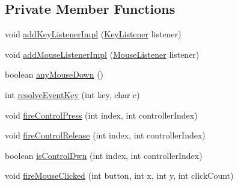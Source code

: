 \subsection*{Private Member Functions}
\begin{DoxyCompactItemize}
\item 
void \mbox{\hyperlink{classorg_1_1newdawn_1_1slick_1_1_input_aa200a37a2a3c219b693e1cb2373e5de0}{add\+Key\+Listener\+Impl}} (\mbox{\hyperlink{interfaceorg_1_1newdawn_1_1slick_1_1_key_listener}{Key\+Listener}} listener)
\item 
void \mbox{\hyperlink{classorg_1_1newdawn_1_1slick_1_1_input_aaaf3afe7c04bcf66d3e2cff7ed5cd4fc}{add\+Mouse\+Listener\+Impl}} (\mbox{\hyperlink{interfaceorg_1_1newdawn_1_1slick_1_1_mouse_listener}{Mouse\+Listener}} listener)
\item 
boolean \mbox{\hyperlink{classorg_1_1newdawn_1_1slick_1_1_input_a464c573c84e5d67e2845b8745370c7a7}{any\+Mouse\+Down}} ()
\item 
int \mbox{\hyperlink{classorg_1_1newdawn_1_1slick_1_1_input_aa1d5dedd4c21f0031aaf52796fa75237}{resolve\+Event\+Key}} (int key, char c)
\item 
void \mbox{\hyperlink{classorg_1_1newdawn_1_1slick_1_1_input_a2ea0ce0e12309c09547e6ed869151506}{fire\+Control\+Press}} (int index, int controller\+Index)
\item 
void \mbox{\hyperlink{classorg_1_1newdawn_1_1slick_1_1_input_a00d5ffd06fe06ffa49902007bccc4d6b}{fire\+Control\+Release}} (int index, int controller\+Index)
\item 
boolean \mbox{\hyperlink{classorg_1_1newdawn_1_1slick_1_1_input_a8ff621186883194fadb3382dcb308aed}{is\+Control\+Dwn}} (int index, int controller\+Index)
\item 
void \mbox{\hyperlink{classorg_1_1newdawn_1_1slick_1_1_input_aa81fced043739508e3df8e050767538c}{fire\+Mouse\+Clicked}} (int button, int x, int y, int click\+Count)
\end{DoxyCompactItemize}
